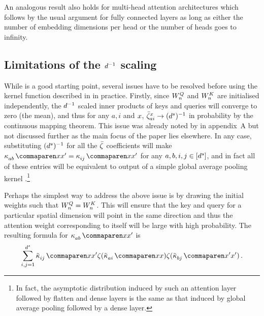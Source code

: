 \documentclass{article}
\begin{document}
An analogous result also holds for multi-head attention architectures
which follows by the usual argument for fully connected layers as long as either the number of embedding dimensions per head or the number of heads goes to infinity.

\subsection{Limitations of the $d^{-1}$ scaling}\label{sect:linear_scaling_limit}

While  is a good starting point, several issues have to be resolved before using the kernel function described in  in practice.
Firstly, since $W_{n}^{Q}$ and $W_{n}^{K}$ are initialised independently, the $d^{-1}$ scaled inner products of keys and queries will converge to zero (the mean), and thus for any $a, i$ and $x$, $\bar{\zeta}_{a i}^{x} \to (d^s)^{-1}$ in probability by the continuous mapping theorem.
This issue was already noted by \citeauthor{yang2019v2} in appendix~A but not discussed further as the main focus of the paper lies elsewhere.
In any case, substituting $(d^s)^{-1}$ for all the $\bar{\zeta}$ coefficients will make $\kernelf{a b}{}{\inputSymbol}{\inputSymbol '} = \kernelf{i j}{}{\inputSymbol}{\inputSymbol '}$ for any $a, b, i, j \in [d^s]$, and in fact all of these entries will be equivalent to output of a simple global average pooling kernel \citep[equation 17]{novak2019bayesian}.\footnote{In fact, the asymptotic distribution induced by such an attention layer followed by flatten and dense layers is the same as that induced by global average pooling followed by a dense layer.}

Perhaps the simplest way to address the above issue is by drawing the initial weights such that $W_{n}^{Q} = W_{n}^{K}$.
This will ensure that the key and query for a particular spatial dimension will point in the same direction and thus the attention weight corresponding to itself will be large with high probability.
The resulting formula for $\kernelf{a b}{}{\inputSymbol}{\inputSymbol'}$ is
\begin{align}\label{eq:fixed_determ_kernel}
    \sum_{i , j = 1}^{\spatialDimension} 
        \kerntildef{i j}{}{\inputSymbol}{\inputSymbol'}
        \softmax(
            \kerntildef{a i}{}{\inputSymbol}{\inputSymbol}
        )
        \softmax(
            \kerntildef{b j}{}{\inputSymbol'}{\inputSymbol'}
        )
    \, .
\end{align}
\end{document}
